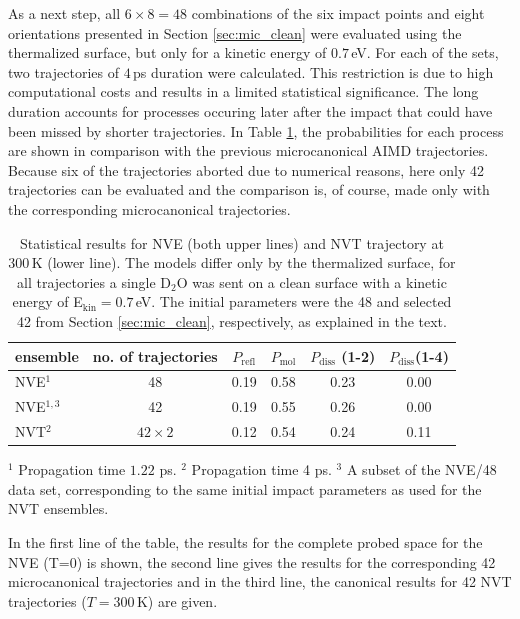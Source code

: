 \documentclass[11pt,DIV=13,BCOR=5mm,a4paper,headinclude]{scrbook}
\begin{document}
As a next step, all $6\times 8=48$ combinations of the six impact points and eight orientations presented in Section \ref{sec:mic_clean} were evaluated using the thermalized surface, but only for a kinetic energy of $0.7\,$eV.
For each of the sets, two trajectories of $4\,$ps duration were calculated.
This restriction is due to high computational costs and results in a limited statistical significance.
The long duration accounts for processes occuring later after the impact that could have been missed by shorter trajectories.
In Table \ref{tab:nvt-nve_comp}, the probabilities for each process are shown in comparison with the previous microcanonical AIMD trajectories.
Because six of the trajectories aborted due to numerical reasons, here only 42 trajectories can be evaluated and the comparison is, of course, made only with the corresponding microcanonical trajectories.
\begin{table}[!h]
 \centering
 \caption{Statistical results for NVE (both upper lines) and NVT trajectory at $300\,$K (lower line).
The models differ only by the thermalized surface, for all trajectories a single D$_2$O was sent on a clean surface with a kinetic energy of E$_\textrm{kin}=0.7\,$eV.
The initial parameters were the 48 and selected 42 from Section \ref{sec:mic_clean}, respectively, as explained in the text.}
\vspace*{.2cm}
  \begin{tabular}{lc|cccc}
 \toprule
  ensemble & no.
of trajectories & $P_\textrm{refl}$ & $P_\textrm{mol}$ & $P_\textrm{diss}$ (1-2) & $P_\textrm{diss}$(1-4) 
 \\\midrule
 NVE$^1$         & 48 & 0.19 & 0.58 & 0.23 & 0.00 \\
 NVE$^{1,3}$     & 42 & 0.19 & 0.55 & 0.26 & 0.00 \\
 NVT$^2$ &$42\times 2$& 0.12 & 0.54 & 0.24 & 0.11 \\\bottomrule
  \end{tabular}
\begin{tablenotes}
 \footnotesize
\item[] $^1$ Propagation time $1.22$ ps.
$^2$ Propagation time 4 ps.
$^3$ A subset of the NVE/48 data set,  corresponding to the same initial impact parameters as used for the NVT ensembles.
\end{tablenotes}
\label{tab:nvt-nve_comp}
\end{table}
In the first line of the table, the results for the complete probed space for the NVE (T=0) is shown, the second line gives the results for the corresponding 42 microcanonical trajectories and in the third line, the canonical results for 42 NVT trajectories ($T=300\,$K) are given.
\end{document}
